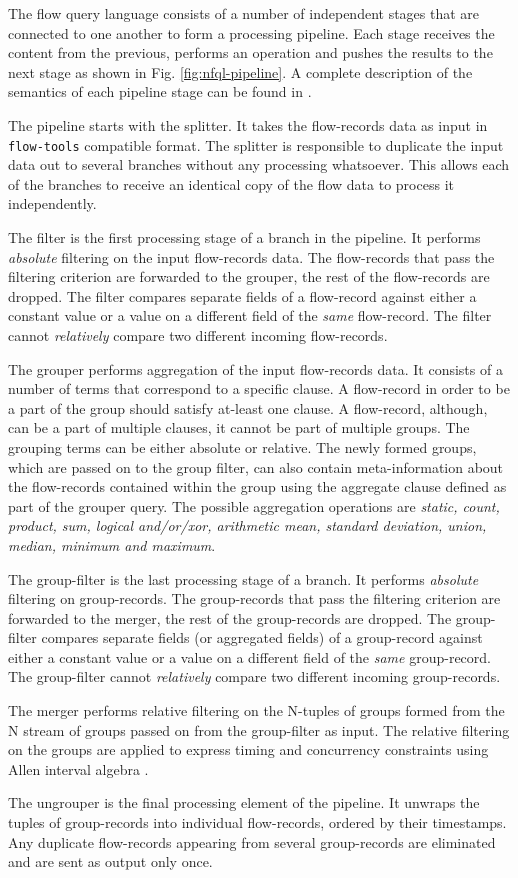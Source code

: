 The flow query language consists of a number of independent stages that are
connected to one another to form a processing pipeline.  Each stage receives
the content from the previous, performs an operation and pushes the results to
the next stage as shown in Fig. \ref{fig:nfql-pipeline}. A complete
description of the semantics of each pipeline stage can be found in
\cite{vmarinov:2009}.

The pipeline starts with the splitter. It takes the flow-records data as input
in \texttt{flow-tools} compatible format. The splitter is responsible to
duplicate the input data out to several branches without any processing
whatsoever. This allows each of the branches to receive an identical copy of
the flow data to process it independently.

The filter is the first processing stage of a branch in the pipeline.  It
performs \emph{absolute} filtering on the input flow-records data.  The
flow-records that pass the filtering criterion are forwarded to the grouper,
the rest of the flow-records are dropped. The filter compares separate fields
of a flow-record against either a constant value or a value on a different
field of the \emph{same} flow-record. The filter cannot \emph{relatively}
compare two different incoming flow-records.

The grouper performs aggregation of the input flow-records data. It consists
of a number of terms that correspond to a specific clause. A flow-record in
order to be a part of the group should satisfy at-least one clause. A
flow-record, although, can be a part of multiple clauses, it cannot be part of
multiple groups. The grouping terms can be either absolute or relative. The
newly formed groups, which are passed on to the group filter, can also contain
meta-information about the flow-records contained within the group using the
aggregate clause defined as part of the grouper query. The possible
aggregation operations are \emph{static, count, product, sum, logical
and/or/xor, arithmetic mean, standard deviation, union, median, minimum and
maximum}.

The group-filter is the last processing stage of a branch. It performs
\emph{absolute} filtering on group-records. The group-records
that pass the filtering criterion are forwarded to the merger, the rest of the
group-records are dropped. The group-filter compares separate fields (or
aggregated fields) of a group-record against either a constant value or a value
on a different field of the \emph{same} group-record. The group-filter cannot
\emph{relatively} compare two different incoming group-records.

The merger performs relative filtering on the N-tuples of groups formed from
the N stream of groups passed on from the group-filter as input. The relative
filtering on the groups are applied to express timing and concurrency
constraints using Allen interval algebra \cite{fallen:1983}.

The ungrouper is the final processing element of the pipeline. It unwraps the
tuples of group-records into individual flow-records, ordered by their
timestamps. Any duplicate flow-records appearing from several group-records
are eliminated and are sent as output only once.

